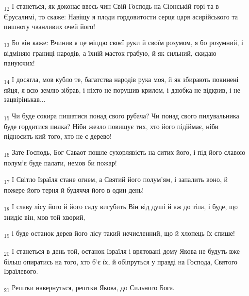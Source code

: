 \begin{tcolorbox}
\textsubscript{12} І станеться, як доконає ввесь чин Свій Господь на Сіонській горі та в Єрусалимі, то скаже: Навіщу я плоди гордовитости серця царя асирійського та пишноту чванливих очей його!
\end{tcolorbox}
\begin{tcolorbox}
\textsubscript{13} Бо він каже: Вчинив я це міццю своєї руки й своїм розумом, я бо розумний, і відміняю границі народів, а їхній маєток грабую, й як сильний, скидаю пануючих!
\end{tcolorbox}
\begin{tcolorbox}
\textsubscript{14} І досягла, мов кубло те, багатства народів рука моя, й як збирають покинені яйця, я всю землю зібрав, і ніхто не порушив крилом, і дзюбка не відкрив, і не зацвірінькав...
\end{tcolorbox}
\begin{tcolorbox}
\textsubscript{15} Чи буде сокира пишатися понад свого рубача? Чи понад свого пилувальника буде гордитися пилка? Ніби жезло повищує тих, хто його підіймає, ніби підносить кий того, хто не є дерево!
\end{tcolorbox}
\begin{tcolorbox}
\textsubscript{16} Зате Господь, Бог Саваот пошле сухорлявість на ситих його, і під його славою полум'я буде палати, немов би пожар!
\end{tcolorbox}
\begin{tcolorbox}
\textsubscript{17} І Світло Ізраїля стане огнем, а Святий його полум'ям, і запалить воно, й пожере його терня й будяччя його в один день!
\end{tcolorbox}
\begin{tcolorbox}
\textsubscript{18} І славу лісу його й його саду вигубить Він від душі й аж до тіла, і буде, що знидіє він, мов той хворий,
\end{tcolorbox}
\begin{tcolorbox}
\textsubscript{19} і буде останок дерев його лісу такий нечисленний, що й хлопець їх спише!
\end{tcolorbox}
\begin{tcolorbox}
\textsubscript{20} І станеться в день той, останок Ізраїля і врятовані дому Якова не будуть вже більш опиратись на того, хто б'є їх, й обіпруться у правді на Господа, Святого Ізраїлевого.
\end{tcolorbox}
\begin{tcolorbox}
\textsubscript{21} Рештки навернуться, рештки Якова, до Сильного Бога.
\end{tcolorbox}
